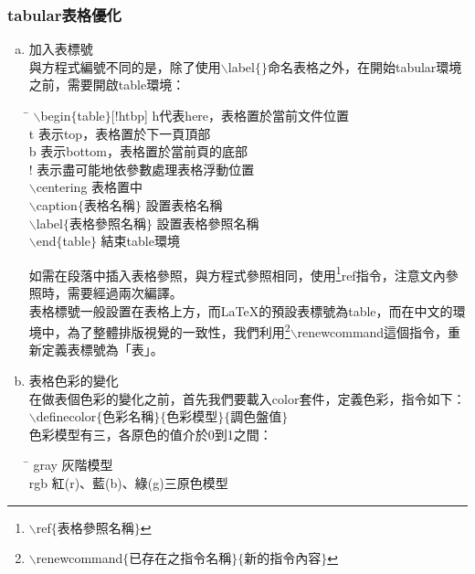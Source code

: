 \subsubsection{\BM tabular表格優化}
\begin{enumerate}[a. ]
	\item 加入表標號 \\
		與方程式編號不同的是，除了使用$\backslash$label$\{ \}$命名表格之外，在開始tabular環境之前，需要開啟table環境：
			\begin{tabbing}
 			\hspace{14em} \= \hspace{5em} \kill
 			$\backslash$begin$\{$table$\}$[!htbp] \> h代表here，表格置於當前文件位置 \\
			              						  \> t 表示top，表格置於下一頁頂部\\
			              						  \> b 表示bottom，表格置於當前頁的底部 \\
												  \> ! 表示盡可能地依參數處理表格浮動位置 \\  
			$\backslash$centering 				  \> 表格置中 \\
			$\backslash$caption$\{$表格名稱$\}$	 \> 設置表格名稱 \\
			$\backslash$label$\{$表格參照名稱$\}$   \> 設置表格參照名稱 \\
			$\backslash$end$\{$table$\}$		  \> 結束table環境			
			\end{tabbing}
		如需在段落中插入表格參照，與方程式參照相同，使用\footnote{$\backslash$ref$\{$表格參照名稱$\}$}ref指令，注意文內參照時，需要經過兩次編譯。\\
		表格標號一般設置在表格上方，而\LaTeX 的預設表標號為table，而在中文的環境中，為了整體排版視覺的一致性，我們利用\footnote{$\backslash$renewcommand$\{$已存在之指令名稱$\}\{$新的指令內容$\}$}$\backslash$renewcommand這個指令，重新定義表標號為「表」。
	\item 表格色彩的變化 \\
		在做表個色彩的變化之前，首先我們要載入color套件，定義色彩，指令如下：\\
 		$\backslash$definecolor$\{$色彩名稱$\}\{$色彩模型$\}\{$調色盤值$\}$ \\
 		色彩模型有三，各原色的值介於0到1之間：
 			\begin{tabbing}
 			\hspace{6em} \= \hspace{5em} \kill
 			gray \> 灰階模型 \\
 			rgb \> 紅(r)、藍(b)、綠(g)三原色模型 \\

\end{tabbing}
\end{enumerate}

